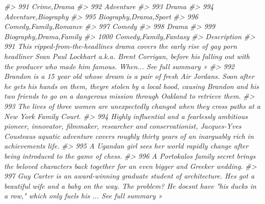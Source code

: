 \documentclass[
]{book}
\newenvironment{Shaded}{\begin{snugshade}}{\end{snugshade}}
\newcommand{\CommentTok}[1]{\textcolor[rgb]{0.56,0.35,0.01}{\textit{#1}}}
\begin{document}
\begin{Shaded}
\begin{Highlighting}[]
\CommentTok{\#\textgreater{} 991             Crime,Drama}
\CommentTok{\#\textgreater{} 992               Adventure}
\CommentTok{\#\textgreater{} 993                   Drama}
\CommentTok{\#\textgreater{} 994     Adventure,Biography}
\CommentTok{\#\textgreater{} 995   Biography,Drama,Sport}
\CommentTok{\#\textgreater{} 996   Comedy,Family,Romance}
\CommentTok{\#\textgreater{} 997                  Comedy}
\CommentTok{\#\textgreater{} 998                   Drama}
\CommentTok{\#\textgreater{} 999  Biography,Drama,Family}
\CommentTok{\#\textgreater{} 1000  Comedy,Family,Fantasy}
\CommentTok{\#\textgreater{}                                                                                                                                                                                                                                        Description}
\CommentTok{\#\textgreater{} 991                            This ripped{-}from{-}the{-}headlines drama covers the early rise of gay porn headliner Sean Paul Lockhart a.k.a. Brent Corrigan, before his falling out with the producer who made him famous. When... See full summary »}
\CommentTok{\#\textgreater{} 992  Brandon is a 15 year old whose dream is a pair of fresh Air Jordans. Soon after he gets his hands on them, they\textquotesingle{}re stolen by a local hood, causing Brandon and his two friends to go on a dangerous mission through Oakland to retrieve them.}
\CommentTok{\#\textgreater{} 993                                                                                                                                            The lives of three women are unexpectedly changed when they cross paths at a New York Family Court.}
\CommentTok{\#\textgreater{} 994                 Highly influential and a fearlessly ambitious pioneer, innovator, filmmaker, researcher and conservationist, Jacques{-}Yves Cousteau\textquotesingle{}s aquatic adventure covers roughly thirty years of an inarguably rich in achievements life.}
\CommentTok{\#\textgreater{} 995                                                                                                                                                      A Ugandan girl sees her world rapidly change after being introduced to the game of chess.}
\CommentTok{\#\textgreater{} 996                                                                                                                                 A Portokalos family secret brings the beloved characters back together for an even bigger and Greeker wedding.}
\CommentTok{\#\textgreater{} 997                               Guy Carter is an award{-}winning graduate student of architecture. He\textquotesingle{}s got a beautiful wife and a baby on the way. The problem? He doesn\textquotesingle{}t have "his ducks in a row," which only fuels his ... See full summary »}

\end{Highlighting}
\end{Shaded}
\end{document}
